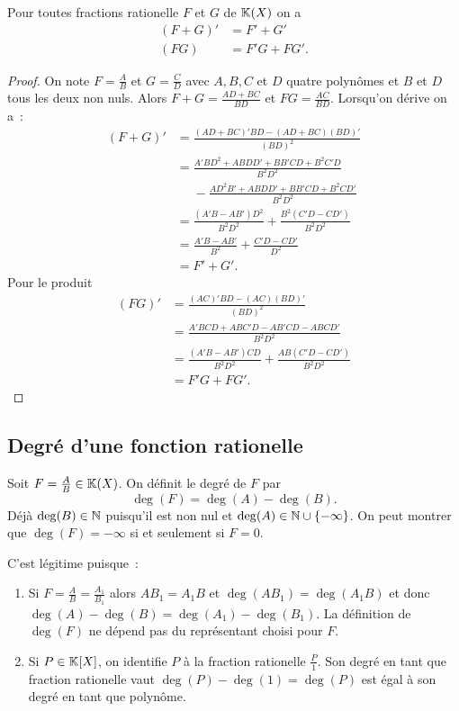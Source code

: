 \begin{theo}
  Pour toutes fractions rationelle $F$ et $G$ de $\mathbb{K}(X)$ on a
  \begin{align}
    (F+G)'&=F'+G' \\
    (FG)&=F'G+FG'.
  \end{align}
\end{theo}
\begin{proof}
  On note $F=\frac{A}{B}$ et $G=\frac{C}{D}$ avec $A,B,C$ et $D$ quatre polynômes et $B$ et $D$ tous les deux non nuls. Alors $F+G=\frac{AD+BC}{BD}$ et $FG=\frac{AC}{BD}$. Lorsqu'on dérive on a~:
  \begin{align}
    (F+G)' &= \frac{(AD+BC)'BD-(AD+BC)(BD)'}{(BD)^2}\\
    &=\frac{A'BD^2+ABDD'+BB'CD+B^2C'D}{B^2D^2}\\
    &\phantom{=}-\frac{AD^2B'+ABDD'+BB'CD+B^2CD'}{B^2D^2}\\
    &=\frac{(A'B-AB')D^2}{B^2D^2} +\frac{B^2(C'D-CD')}{B^2D^2} \\
    &=\frac{A'B-AB'}{B^2} +\frac{C'D-CD'}{D^2}\\
    &=F'+G'.
  \end{align}
  Pour le produit
  \begin{align}
    (FG)' &= \frac{(AC)'BD-(AC)(BD)'}{(BD)^2}\\
    &=\frac{A'BCD+ABC'D-AB'CD-ABCD'}{B^2D^2}\\
    &=\frac{(A'B-AB')CD}{B^2D^2} + \frac{AB(C'D-CD')}{B^2D^2}\\
    &=F'G +FG'.
  \end{align}
\end{proof}

\subsection{Degré d'une fonction rationelle}

\begin{defdef}
  Soit $F=\frac{A}{B} \in \mathbb{K}(X)$. On définit le degré de $F$ par
  \begin{equation}
    \deg(F)=\deg(A)-\deg(B).
  \end{equation}
  Déjà $\deg(B) \in \mathbb{N}$ puisqu'il est non nul et $\deg(A) \in \mathbb{N}\cup\{-\infty\}$. On peut montrer que $\deg(F)=-\infty$ si et seulement si $F=0$.
\end{defdef}

C'est légitime puisque~:
\begin{enumerate}
\item Si $F=\frac{A}{B}=\frac{A_1}{B_1}$ alors $AB_1=A_1B$ et $\deg(AB_1)=\deg(A_1B)$ et donc $\deg(A)-\deg(B)=\deg(A_1)-\deg(B_1)$. La définition de $\deg(F)$ ne dépend pas du représentant choisi pour $F$.
\item Si $P\in\mathbb{K}[X]$, on identifie $P$ à la fraction rationelle $\frac{P}{1}$. Son degré en tant que fraction rationelle vaut $\deg(P)-\deg(1)=\deg(P)$ est égal à son degré en tant que polynôme.
\end{enumerate}

